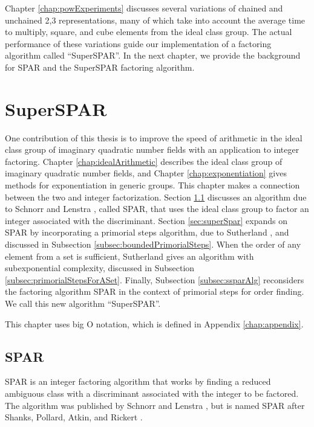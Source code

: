 \documentclass{ucalgthes1}
\theoremstyle{definition}
\begin{document}
Chapter \ref{chap:powExperiments} discusses several variations of chained and unchained 2,3 representations, many of which take into account the average time to multiply, square, and cube elements from the ideal class group.  The actual performance of these variations guide our implementation of a factoring algorithm called ``SuperSPAR''.  In the next chapter, we provide the background for SPAR and the SuperSPAR factoring algorithm.


\chapter{SuperSPAR}
\label{chap:superspar}

One contribution of this thesis is to improve the speed of arithmetic in the ideal class group of imaginary quadratic number fields with an application to integer factoring.  Chapter \ref{chap:idealArithmetic} describes the ideal class group of imaginary quadratic number fields, and Chapter \ref{chap:exponentiation} gives methods for exponentiation in generic groups.  This chapter makes a connection between the two and integer factorization.  Section \ref{sec:spar} discusses an algorithm due to Schnorr and Lenstra \cite{Schnorr1984}, called SPAR, that uses the ideal class group to factor an integer associated with the discriminant.  Section \ref{sec:superSpar} expands on SPAR by incorporating a primorial steps algorithm, due to Sutherland \cite[\S 4.1]{Sutherland2007}, and discussed in Subsection \ref{subsec:boundedPrimorialSteps}.   When the order of any element from a set is sufficient, Sutherland \cite[\S 5.4]{Sutherland2007} gives an algorithm with subexponential complexity, discussed in Subsection \ref{subsec:primorialStepsForASet}.  Finally, Subsection \ref{subsec:ssparAlg} reconsiders the factoring algorithm SPAR in the context of primorial steps for order finding.  We call this new algorithm ``SuperSPAR''.

This chapter uses big O notation, which is defined in Appendix \ref{chap:appendix}.


\section{SPAR}
\label{sec:spar}

SPAR is an integer factoring algorithm that works by finding a reduced ambiguous class with a discriminant associated with the integer to be factored.  The algorithm was published by Schnorr and Lenstra \cite{Schnorr1984}, but is named SPAR after Shanks, Pollard, Atkin, and Rickert \cite[p.484]{Lenstra1992}.
\end{document}
